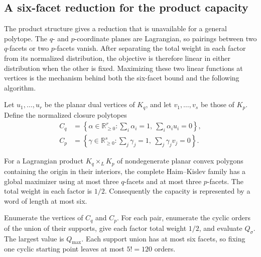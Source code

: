 \subsection{A six-facet reduction for the product capacity}
\label{subsec:quadratic-program-product-six-facet}

The product structure gives a reduction that is unavailable for a general
polytope.  The \(q\)- and \(p\)-coordinate planes are Lagrangian, so pairings
between two \(q\)-facets or two \(p\)-facets vanish.  After separating the
total weight in each factor from its normalized distribution, the objective
is therefore linear in either distribution when the other is fixed.
Maximizing these two linear functions at vertices is the mechanism behind
both the six-facet bound and the following algorithm.

Let \(u_1,\ldots,u_r\) be the planar dual vertices of \(K_q\), and let
\(v_1,\ldots,v_s\) be those of \(K_p\).  Define the normalized closure
polytopes
\begin{align*}
  C_q&=\left\{\alpha\in\mathbb R_{\geq0}^{r}:
    \sum_i\alpha_i=1,\ \sum_i\alpha_i u_i=0\right\},\\
  C_p&=\left\{\gamma\in\mathbb R_{\geq0}^{s}:
    \sum_j\gamma_j=1,\ \sum_j\gamma_j v_j=0\right\}.
\end{align*}

\begin{theorem}
\label{thm:quadratic-program-product-six-facet}
For a Lagrangian product \(K_q\times_LK_p\) of nondegenerate planar convex
polygons containing the origin in their interiors, the complete
Haim--Kislev family has a global maximizer using at most three \(q\)-facets
and at most three \(p\)-facets.  The total weight in each factor is \(1/2\).
Consequently the capacity is represented by a word of length at most six.
\end{theorem}

\begin{algorithm}
\label{alg:quadratic-program-product-closure-vertices}
Enumerate the vertices of \(C_q\) and \(C_p\).  For each pair, enumerate the
cyclic orders of the union of their supports, give each factor total weight
\(1/2\), and evaluate \(Q_\sigma\).  The largest value is \(Q_{\max}\).
Each support union has at most six facets, so fixing one cyclic starting point
leaves at most \(5!=120\) orders.
\end{algorithm}

